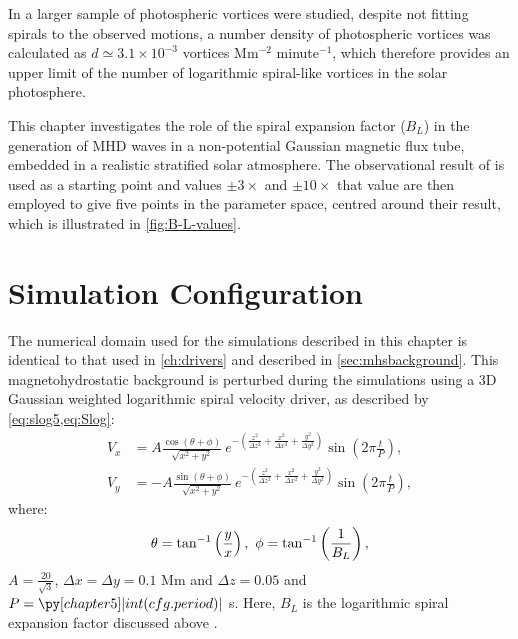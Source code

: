In \cite{bonet2010} a larger sample of photospheric vortices were studied, despite not fitting spirals to the observed motions, a number density of photospheric vortices was calculated as $d \simeq 3.1 \times 10^{-3}$ vortices Mm$^{-2}$ minute$^{-1}$, which therefore provides an upper limit of the number of logarithmic spiral-like vortices in the solar photosphere.

This chapter investigates the role of the spiral expansion factor ($B_L$) in the generation of MHD waves in a non-potential Gaussian magnetic flux tube, embedded in a realistic stratified solar atmosphere.
The observational result of \cite{bonet2008} is used as a starting point and values $\pm 3\times$ and $\pm 10\times$ that value are then employed to give five points in the parameter space, centred around their result, which is illustrated in \cref{fig:B-L-values}.


\section{Simulation Configuration}\label{sec:simconfig}
The numerical domain used for the simulations described in this chapter is identical to that used in \cref{ch:drivers} and described in \cref{sec:mhsbackground}.
This magnetohydrostatic background is perturbed during the simulations using a 3D Gaussian weighted logarithmic spiral velocity driver, as described by \cref{eq:slog5,eq:Slog}:
\begin{subequations}
    \begin{align}
    V_x &= A \frac{\cos(\theta + \phi)}{\sqrt{x^2 + y^2}}\ e^{-\left(\frac{z^2}{\Delta z^2} + \frac{x^2}{\Delta x^2} + \frac{y^2}{\Delta y^2}\right)} \sin \left(2\pi \frac{t}{P}\right),\\
    V_y &= - A \frac{\sin(\theta + \phi)}{\sqrt{x^2 + y^2}}\ e^{-\left(\frac{z^2}{\Delta z^2} + \frac{x^2}{\Delta x^2} + \frac{y^2}{\Delta y^2}\right)} \sin \left(2\pi \frac{t}{P}\right),
    \end{align}
    \label{eq:slog5}
\end{subequations}
where:
\begin{equation*}
\theta = \tan^{-1}\left(\frac{y}{x}\right),\ \phi = \tan^{-1}\left(\frac{1}{B_L}\right),\notag	
\end{equation*}
$A=\frac{20}{\sqrt{3}}$, $\Delta x = \Delta y = 0.1$ Mm and $\Delta z = 0.05$ and $P=\py[chapter5]|int(cfg.period)|$ s.
Here, $B_L$ is the logarithmic spiral expansion factor discussed above  \citep{mumford2015}.

